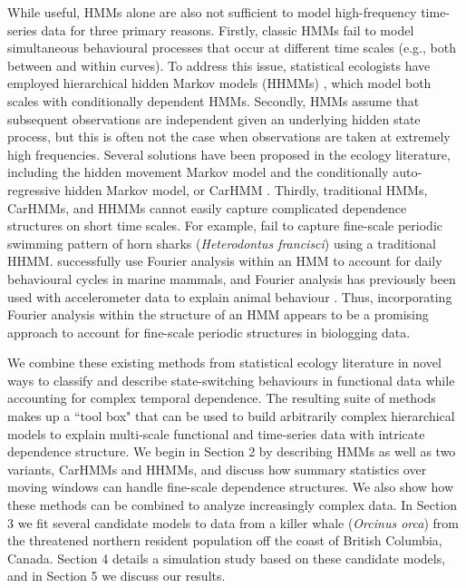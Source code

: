 While useful, HMMs alone are also not sufficient to model high-frequency time-series data for three primary reasons.
Firstly, classic HMMs fail to model simultaneous behavioural processes that occur at different time scales (e.g., both between and within curves). To address this issue, statistical ecologists have employed hierarchical hidden Markov models (HHMMs) \citep{Barajas:2017,Adam:2019}, which model both scales with conditionally dependent HMMs.
Secondly, HMMs assume that subsequent observations are independent given an underlying hidden state process, but this is often not the case when observations are taken at extremely high frequencies. Several solutions have been proposed in the ecology literature, including the hidden movement Markov model \citep{Whoriskey:2016} and the conditionally auto-regressive hidden Markov model, or CarHMM \citep{Lawler:2019}. 
Thirdly, traditional HMMs, CarHMMs, and HHMMs cannot easily capture complicated dependence structures on short time scales. For example, \citet{Adam:2019} fail to capture fine-scale periodic swimming pattern of horn sharks (\textit{Heterodontus francisci}) using a traditional HHMM. \citet{Heerah:2017} successfully use Fourier analysis within an HMM to account for daily behavioural cycles in marine mammals, and Fourier analysis has previously been used with accelerometer data to explain animal behaviour \citep{Fehlmann:2017,Shorter:2017}. Thus, incorporating Fourier analysis within the structure of an HMM appears to be a promising approach to account for fine-scale periodic structures in biologging data.

We combine these existing methods from statistical ecology literature in novel ways to classify and describe state-switching behaviours in functional data while accounting for complex temporal dependence. The resulting suite of methods makes up a ``tool box" that can be used to build arbitrarily complex hierarchical models to explain multi-scale functional and time-series data with intricate dependence structure.
We begin in Section 2 by describing HMMs as well as two variants, CarHMMs and HHMMs, and discuss how summary statistics over moving windows can handle fine-scale dependence structures. We also show how these methods can be combined to analyze increasingly complex data. In Section 3 we fit several candidate models to data from a killer whale (\textit{Orcinus orca}) from the threatened northern resident population off the coast of British Columbia, Canada. Section 4 details a simulation study based on these candidate models, and in Section 5 we discuss our results.